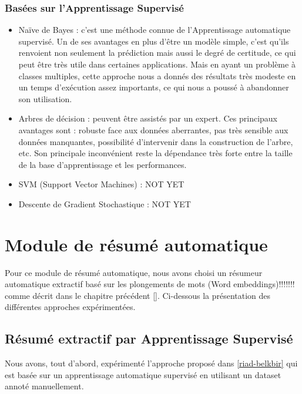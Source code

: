         \subsubsection{Basées sur l'Apprentissage Supervisé}
        \begin{itemize}
            \item{Naïve de Bayes : }
            c'est une méthode connue de l'Apprentissage automatique supervisé. Un de ses avantages en plus d'être un modèle simple, c'est qu'ils renvoient non seulement la prédiction mais aussi le degré de certitude, ce qui peut être très utile dans certaines applications. Mais en ayant un problème à classes multiples, cette approche nous a donnés des résultats très modeste en un temps d'exécution assez importants, ce qui nous a poussé à abandonner son utilisation.\\
            
            \item{Arbres de décision : }
            peuvent être assistés par un expert. Ces principaux avantages sont : robuste face aux données aberrantes, pas très sensible aux données manquantes, possibilité d’intervenir dans la construction de l’arbre, etc. Son principale inconvénient reste la dépendance très forte entre la taille de la base d’apprentissage et les performances.\\
            
            \item{SVM (Support Vector Machines) : }
            NOT YET
            
            
            \item{Descente de Gradient Stochastique : }
            NOT YET
        \end{itemize}


\section{Module de résumé automatique}
Pour ce module de résumé automatique, nous avons choisi un résumeur automatique extractif \cite{notreresume} basé sur les plongements de mots (Word embeddings)!!!!!!! comme décrit dans le chapitre précédent \autoref{}.
Ci-dessous la présentation des différentes approches expérimentées.
    \subsection{Résumé extractif par Apprentissage Supervisé}
    Nous avons, tout d'abord, expérimenté l'approche proposé dans \ref{riad-belkbir} qui est basée sur un apprentissage automatique supervisé en utilisant un dataset annoté manuellement. 
